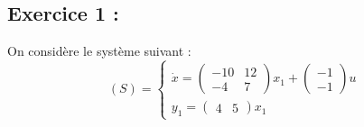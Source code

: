 \documentclass[../main.tex]{subfiles}
\begin{document}
\subsection*{Exercice 1 :}
On considère le système suivant :
\[(S)= \left \{
   \begin{matrix}
   \dot{x} = \begin{pmatrix}-10 & 12\\-4 & 7\end{pmatrix} x_1 +  \begin{pmatrix} -1\\-1\end{pmatrix} u\\
   y_1 =\begin{pmatrix}4 & 5\end{pmatrix}x_1
   \end{matrix}
   \right.
\]
\end{document}
